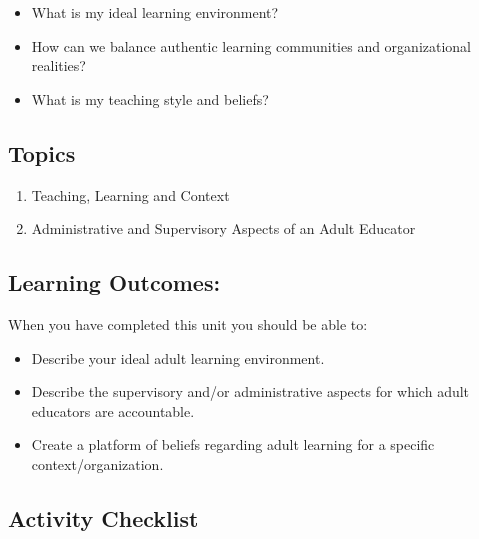 \documentclass[
]{book}
\providecommand{\tightlist}{%
  \setlength{\itemsep}{0pt}\setlength{\parskip}{0pt}}
\begin{document}
\begin{itemize}
\tightlist
\item
  What is my ideal learning environment?\\
\item
  How can we balance authentic learning communities and organizational realities?\\
\item
  What is my teaching style and beliefs?
\end{itemize}

\hypertarget{topics-9}{%
\subsection*{Topics}\label{topics-9}}

\begin{enumerate}
\def\labelenumi{\arabic{enumi}.}
\tightlist
\item
  Teaching, Learning and Context\\
\item
  Administrative and Supervisory Aspects of an Adult Educator
\end{enumerate}

\hypertarget{learning-outcomes-9}{%
\subsection*{Learning Outcomes:}\label{learning-outcomes-9}}

When you have completed this unit you should be able to:

\begin{itemize}
\tightlist
\item
  Describe your ideal adult learning environment.\\
\item
  Describe the supervisory and/or administrative aspects for which adult educators are accountable.\\
\item
  Create a platform of beliefs regarding adult learning for a specific context/organization.
\end{itemize}

\hypertarget{activity-checklist-9}{%
\subsection*{Activity Checklist}\label{activity-checklist-9}}
\end{document}
